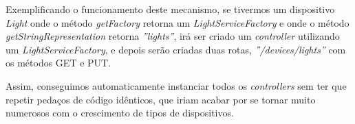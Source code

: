Exemplificando o funcionamento deste mecanismo, se tivermos um dispositivo \textit{Light} onde o método \textit{getFactory} retorna um \textit{LightServiceFactory} e onde o método \textit{getStringRepresentation} retorna \textit{''lights''}, irá ser criado um \textit{controller} utilizando um \textit{LightServiceFactory}, e depois serão criadas duas rotas, \textit{''/devices/lights''} com os métodos GET e PUT.

Assim, conseguimos automaticamente instanciar todos os \textit{controllers} sem ter que repetir pedaços de código idênticos, que iriam acabar por se tornar muito numerosos com o crescimento de tipos de dispositivos.